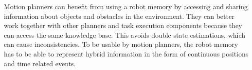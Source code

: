 Motion planners can benefit from using a robot memory by accessing and
sharing information about objects and obstacles in the environment.
They can better work together with other planners and task execution
components because they can access the same knowledge base. This
avoids double state estimations, which can cause inconsistencies. To
be usable by motion planners, the robot memory has to be able to
represent hybrid information in the form of continuous positions and
time related events.

